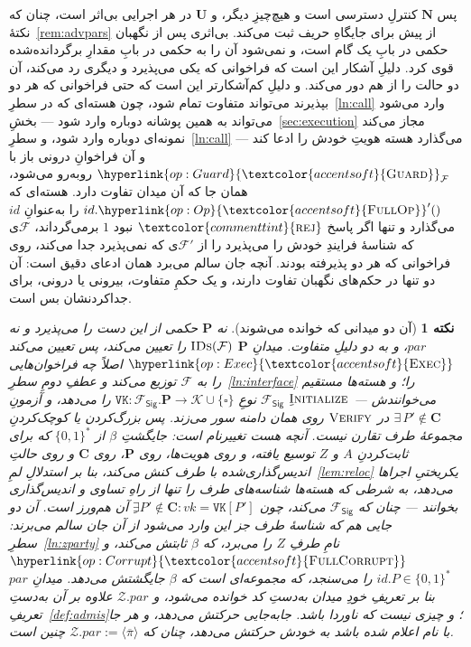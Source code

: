 \documentclass[10pt,oneside,openany]{book}
\newcommand{\Ps}{\mathbf{P}}
\newcommand{\admits}{\mathbf{N}}
\newcommand{\pars}{\mathit{par}}
\newcommand{\uses}{\mathbf{U}}
\newcommand{\Cs}{\mathbf{C}}
\newcommand{\F}{\mathcal{F}}
\newcommand{\Zenv}{\mathcal{Z}}
\newcommand{\op}[1]{\textnormal{\textsc{#1}}}
\newcommand{\opl}[1]{\hyperlink{op:#1}{\textcolor{accentsoft}{\op{#1}}}}
\newcommand{\fopl}[1]{\hyperlink{op:#1}{\textcolor{accentsoft}{\op{Full}\op{#1}}}}
\newcommand{\IDs}{\op{IDs}}
\newcommand{\id}{id}
\newcommand{\atom}[1]{\textcolor{commenttint}{\op{#1}}}
\newcommand{\rej}{\atom{rej}}
\newcommand{\Fsig}{\mathcal{F}_{\mathsf{Sig}}}
\newcommand{\vk}{\mathit{vk}}
\newcommand{\unset}{\square}
\newcommand{\Keys}{\mathcal{K}}
\newcommand{\V}[1]{\mathtt{#1}}
\newcommand{\bits}{\{0,1\}^*}
\newcommand{\ncl}[1]{\langle #1 \rangle}
\theoremstyle{accentdef}
\newtheorem{remark}[definition]{نکته}
\theoremstyle{accentplain}
\begin{document}
پس $\admits$ کنترلِ دسترسی است و هیچ‌چیزِ دیگر، و $\uses$ در هر اجرایی
بی‌اثر است، چنان که نکتهٔ~\ref{rem:advpars} از پیش برای جایگاهِ حریف ثبت
می‌کند. بی‌اثری پس از نگهبان حکمی در بابِ یک گام است، و نمی‌شود آن را به
حکمی در بابِ مقدارِ برگردانده‌شده قوی کرد. دلیلِ آشکار این است که فراخوانی
که یکی می‌پذیرد و دیگری رد می‌کند، آن دو حالت را از هم دور می‌کند. و دلیلِ
کم‌آشکارتر این است که حتی فراخوانی که هر دو بپذیرند می‌تواند متفاوت تمام
شود، چون هسته‌ای که در سطرِ~\ref{ln:call} وارد می‌شود می‌تواند به همین
پوشانه دوباره وارد شود --- بخشِ~\ref{sec:execution} مجاز می‌کند نمونه‌ای
دوباره وارد شود، و سطرِ~\ref{ln:call} می‌گذارد هسته هویتِ خودش را ادعا کند
--- و آن فراخوانِ درونی باز با $\opl{Guard}_{\F}$ روبه‌رو می‌شود، همان جا که
آن میدان تفاوت دارد. هسته‌ای که $\id.\fopl{Op}'()$ را به‌عنوانِ $\id$
می‌گذارد و تنها اگر پاسخ $\rej$ نبود $1$ برمی‌گرداند، $\F$ی که شناسهٔ
فرایندِ خودش را می‌پذیرد را از $\F'$ی که نمی‌پذیرد جدا می‌کند، روی فراخوانی
که هر دو پذیرفته بودند. آنچه جان سالم می‌برد همان ادعای دقیق است: آن دو
تنها در حکم‌های نگهبان تفاوت دارند، و یک حکمِ متفاوت، بیرونی یا درونی، برای
جدا‌کردنشان بس است.

\begin{remark}[آن دو میدانی که خوانده می‌شوند]\label{rem:fields}
نه $\Ps$ حکمی از این دست را می‌پذیرد و نه $\pars$، و به دو دلیلِ متفاوت.
میدانِ $\Ps$ $\IDs(\F)$ را تعیین می‌کند، پس تعیین می‌کند $\opl{Exec}$ اصلاً
چه فراخوان‌هایی را به $\F$ توزیع می‌کند و عطفِ دومِ سطرِ~\ref{ln:interface}
را؛ و هسته‌ها مستقیم می‌خوانندش --- $\op{Initialize}$ِ $\Fsig$ نوعِ $\V{VK}
: \Fsig.\Ps \to \Keys \cup \{\unset\}$ را می‌دهد، و آزمونِ $\exists\, P'
\notin \Cs$ در $\op{Verify}$ روی همان دامنه سور می‌زند. پس بزرگ‌کردن یا
کوچک‌کردنِ مجموعهٔ طرف تقارن نیست. آنچه \emph{هست} \emph{تغییرنام} است:
جایگشتِ $\beta$ از $\bits$ که برای ثابت‌کردنِ $A$ و $Z$ توسیع یافته، و روی
هویت‌ها، روی $\Ps$، روی $\Cs$ و روی حالتِ اندیس‌گذاری‌شده با طرف کنش
می‌کند، بنا بر استدلالِ لمِ~\ref{lem:reloc} یکریختیِ اجراها می‌دهد، به شرطی
که هسته‌ها شناسه‌های طرف را تنها از راهِ تساوی و اندیس‌گذاری بخوانند ---
چنان که $\Fsig$ می‌کند، چون $\exists P' \notin \Cs : \vk = \V{VK}[P']$ِ آن
هم‌ورز است. آن دو جایی هم که شناسهٔ طرف جز این وارد می‌شود از آن جان سالم
می‌برند: سطرِ~\ref{ln:zparty} نامِ طرفِ $Z$ را می‌برد، که $\beta$ ثابتش
می‌کند، و $\fopl{Corrupt}$ $\id.P \in \bits$ را می‌سنجد، که مجموعه‌ای است
که $\beta$ جایگشتش می‌دهد. میدانِ $\pars$ بنا بر تعریفِ خودِ میدان به‌دستِ
کد خوانده می‌شود، و $\Zenv.\pars$ علاوه بر آن به‌دستِ
تعریفِ~\ref{def:admis}؛ و چیزی نیست که ناوردا باشد. جابه‌جایی حرکتش می‌دهد،
و هر جا با نام اعلام شده باشد به خودش حرکتش می‌دهد، چنان که $\Zenv.\pars :=
\ncl{\overline{\pi}}$ چنین است.
\end{remark}
\end{document}
